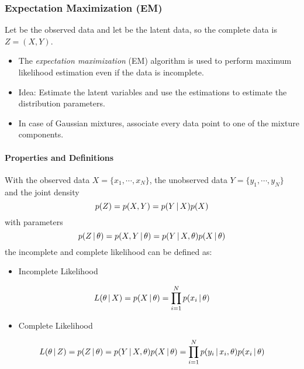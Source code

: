 			\subsubsection{Expectation Maximization (EM)} %
				Let  be the observed data and let  be the latent data, so the complete data is \( Z = (X, Y) \).
				\begin{itemize}
					\item The \emph{expectation maximization} (EM) algorithm is used to perform maximum likelihood estimation even if the data is incomplete.
					\item Idea: Estimate the latent variables and use the estimations to estimate the distribution parameters.
					\item In case of Gaussian mixtures, associate every data point to one of the mixture components.
				\end{itemize}

				\paragraph{Properties and Definitions}
					With the observed data \( X = \{ x_1, \cdots, x_N \} \), the unobserved data \( Y = \{ y_1, \cdots, y_N \} \) and the joint density
					\begin{equation}
						p(Z) = p(X, Y) = p(Y \,\vert\, X) p(X)
					\end{equation}
					with parameters
					\begin{equation}
						p(Z \,\vert\, \theta) = p(X, Y \,\vert\, \theta) = p(Y \,\vert\, X, \theta) p(X \,\vert\, \theta)
					\end{equation}
					the incomplete and complete likelihood can be defined as:
					\begin{itemize}
						\item Incomplete Likelihood
					\end{itemize}
					\begin{equation}
						L(\theta \,\vert\, X) = p(X \,\vert\, \theta) = \prod_{i = 1}^{N} p(x_i \,\vert\, \theta)
					\end{equation}
					\begin{itemize}
						\item Complete Likelihood
					\end{itemize}
					\begin{equation}
						L(\theta \,\vert\, Z) = p(Z \,\vert\, \theta) = p(Y \,\vert\, X, \theta) p(X \,\vert\, \theta) = \prod_{i = 1}^{N} p(y_i \,\vert\, x_i, \theta) p(x_i \,\vert\, \theta)
					\end{equation}

